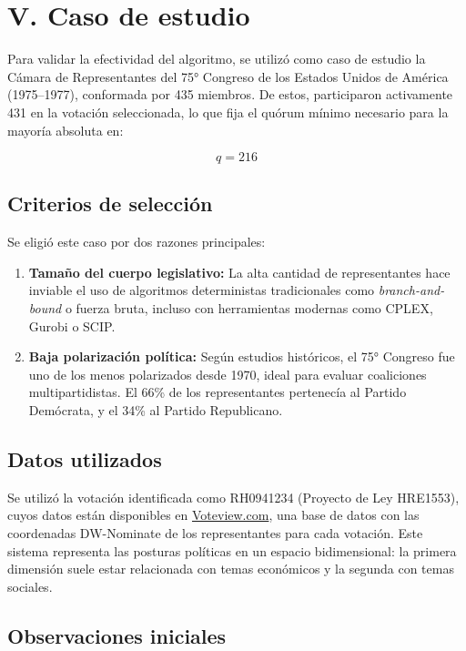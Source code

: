 \documentclass[12pt]{article}
\begin{document}
\section*{V. Caso de estudio}

Para validar la efectividad del algoritmo, se utilizó como caso de estudio la Cámara de Representantes del 75° Congreso de los Estados Unidos de América (1975–1977), conformada por 435 miembros. De estos, participaron activamente 431 en la votación seleccionada, lo que fija el quórum mínimo necesario para la mayoría absoluta en:

\[
q = 216
\]

\subsection*{Criterios de selección}

Se eligió este caso por dos razones principales:
\begin{enumerate}
    \item \textbf{Tamaño del cuerpo legislativo:} La alta cantidad de representantes hace inviable el uso de algoritmos deterministas tradicionales como \textit{branch-and-bound} o fuerza bruta, incluso con herramientas modernas como CPLEX, Gurobi o SCIP.
    \item \textbf{Baja polarización política:} Según estudios históricos, el 75° Congreso fue uno de los menos polarizados desde 1970, ideal para evaluar coaliciones multipartidistas. El 66\% de los representantes pertenecía al Partido Demócrata, y el 34\% al Partido Republicano.
\end{enumerate}

\subsection*{Datos utilizados}

Se utilizó la votación identificada como RH0941234 (Proyecto de Ley HRE1553), cuyos datos están disponibles en \href{https://voteview.com/}{Voteview.com}, una base de datos con las coordenadas DW-Nominate de los representantes para cada votación. Este sistema representa las posturas políticas en un espacio bidimensional: la primera dimensión suele estar relacionada con temas económicos y la segunda con temas sociales.

\subsection*{Observaciones iniciales}
\end{document}
